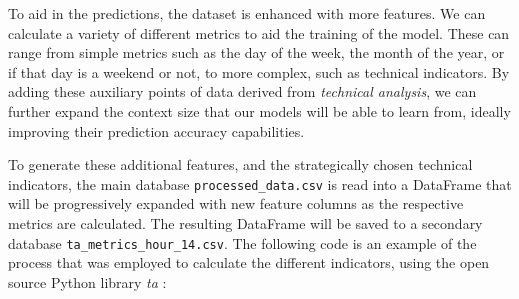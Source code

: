 \documentclass[12pt]{report} %
\begin{document}
To aid in the predictions, the dataset is enhanced with more features. We can calculate a variety of different metrics to aid the training of the model. These can range from simple metrics such as the day of the week, the month of the year, or if that day is a weekend or not, to more complex, such as technical indicators. By adding these auxiliary points of data derived from \textit{technical analysis}, we can further expand the context size that our models will be able to learn from, ideally improving their prediction accuracy capabilities.

To generate these additional features, and the strategically chosen technical indicators, the main database \small{\verb|processed_data.csv|} is read into a DataFrame that will be progressively expanded with new feature columns as the respective metrics are calculated. The resulting DataFrame will be saved to a secondary database \small{\verb|ta_metrics_hour_14.csv|}. The following code is an example of the process that was employed to calculate the different indicators, using the open source Python library \textit{ta} \cite{ta-lib}:
\end{document}
